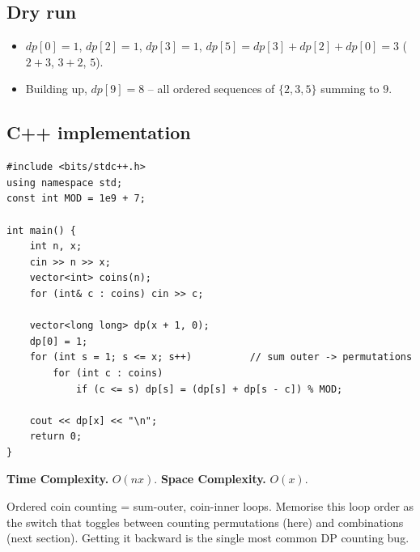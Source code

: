 \subsection*{Dry run}


\begin{itemize}
  \item $\textit{dp}[0]=1$, $\textit{dp}[2]=1$, $\textit{dp}[3]=1$,
        $\textit{dp}[5]=\textit{dp}[3]+\textit{dp}[2]+\textit{dp}[0]=3$
        ($2{+}3$, $3{+}2$, $5$).
  \item Building up, $\textit{dp}[9]=8$ -- all ordered sequences of
        $\{2,3,5\}$ summing to $9$.
\end{itemize}

\subsection*{C++ implementation}

\begin{lstlisting}
#include <bits/stdc++.h>
using namespace std;
const int MOD = 1e9 + 7;

int main() {
    int n, x;
    cin >> n >> x;
    vector<int> coins(n);
    for (int& c : coins) cin >> c;

    vector<long long> dp(x + 1, 0);
    dp[0] = 1;
    for (int s = 1; s <= x; s++)          // sum outer -> permutations
        for (int c : coins)
            if (c <= s) dp[s] = (dp[s] + dp[s - c]) % MOD;

    cout << dp[x] << "\n";
    return 0;
}
\end{lstlisting}

\begin{complexitybox}
\textbf{Time Complexity.} $O(nx)$. \textbf{Space Complexity.} $O(x)$.
\end{complexitybox}

\begin{takeawaybox}
Ordered coin counting = sum-outer, coin-inner loops. Memorise this loop
order as the switch that toggles between counting permutations (here) and
combinations (next section). Getting it backward is the single most common
DP counting bug.
\end{takeawaybox}
